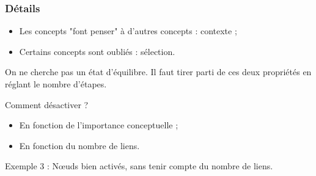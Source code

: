 \documentclass[12pt]{beamer}
\begin{document}
\begin{frame}[allowframebreaks = 0.7]
 \frametitle{Détails}
 
 \begin{itemize}
  \item Les concepts "font penser" à d'autres concepts : contexte ;
  \item Certains concepts sont oubliés : sélection.
 \end{itemize}

 On ne cherche pas un état d'équilibre. Il faut tirer parti de ces deux propriétés en réglant le nombre d'étapes.
 
 \begin{block}{Comment désactiver ?}
 \begin{itemize}
  \item En fonction de l'importance conceptuelle ;
  \item En fonction du nombre de liens.
  \end{itemize}
 \end{block}

 Exemple 3 :  N\oe uds bien activés, sans tenir compte du nombre de liens.
 
 
\end{frame}
\end{document}
